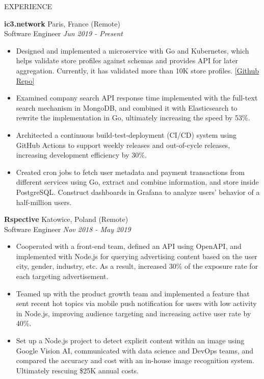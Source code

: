 \documentclass{resume} %
\begin{document}
\begin{rSection}{EXPERIENCE}

\textbf{ic3.network} \hfill Paris, France (Remote)\\
Software Engineer \hfill \textit{Jun 2019 - Present}
 \begin{itemize}
    \itemsep -3pt {} 
\item Designed and implemented a microservice with Go and Kubernetes, which helps validate store profiles against schemas and provides API for later aggregation. Currently, it has validated more than 10K store profiles. \href{https://github.com/MurmurationsNetwork/MurmurationsServices}{[Github Repo]}
\item Examined company search API response time implemented with the full-text search mechanism in MongoDB, and combined it with Elasticsearch to rewrite the implementation in Go, ultimately increasing the speed by 53\%.
\item Architected a continuous build-test-deployment (CI/CD) system using GitHub Actions to support weekly releases and out-of-cycle releases, increasing development efficiency by 30\%.
\item  Created cron jobs to fetch user metadata and payment transactions from different services using Go, extract and combine information, and store inside PostgreSQL. Construct dashboards in Grafana to analyze users' behavior of a half-million users.
 \end{itemize}

\textbf{Rspective} \hfill Katowice, Poland (Remote)\\
Software Engineer  \hfill \textit{Nov 2018 - May 2019}
 \begin{itemize}
    \itemsep -3pt {} 
    \item Cooperated with a front-end team, defined an API using OpenAPI, and implemented with Node.js for querying advertising content based on the user city, gender, industry, etc. As a result, increased 30\% of the exposure rate for each targeting advertisement.
    \item  Teamed up with the product growth team and implemented a feature that sent recent hot topics via mobile push notification for users with low activity in Node.js, improving audience targeting and increasing active user rate by 40\%.
    \item Set up a Node.js project to detect explicit content within an image using Google Vision AI, communicated with data science and DevOps teams, and compared the accuracy and cost with an in-house image recognition system. Ultimately rescuing \$25K annual costs.
 \end{itemize}


\end{rSection}
\end{document}
